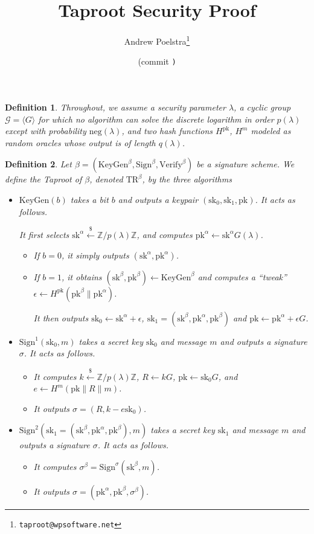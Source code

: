 \documentclass[letterpaper]{article}
\title{Taproot Security Proof}
\author{Andrew Poelstra\footnote{\texttt{taproot@wpsoftware.net}}}
\date{\gitAuthorDate{} (commit \texttt{\gitAbbrevHash)}}
\newtheorem{defn}{Definition}
\newcommand{\TR}[1]{\mathrm{TR}^{#1}}
\newcommand{\KeyGen}{\mathrm{KeyGen}}
\newcommand{\Sign}{\mathrm{Sign}}
\newcommand{\Verify}{\mathrm{Verify}}
\newcommand{\sk}{\mathrm{sk}}
\newcommand{\pk}{\mathrm{pk}}
\newcommand{\negl}{\mathrm{neg}}
\newcommand{\randgets}{\xleftarrow{\$}}
\begin{document}
\maketitle

\modulolinenumbers[10]

\begin{defn} Throughout, we assume a security parameter $\lambda$, a
cyclic group $\mathcal{G} = \langle G\rangle$ for which no algorithm can solve the
discrete logarithm in order $p(\lambda)$ except with probability
$\negl(\lambda)$, and two hash functions $H^\pk$, $H^m$ modeled as
random oracles whose output is of length $q(\lambda)$.\end{defn}

\begin{defn} Let $\beta = (\KeyGen^\beta, \Sign^\beta, \Verify^\beta)$ be a
signature scheme. We define the \emph{Taproot} of
$\beta$, denoted $\TR{\beta}$, by the three algorithms

\begin{itemize}
\item $\KeyGen(b)$ takes a bit $b$ and outputs a keypair
$(\sk_0, \sk_1, \pk)$. It acts as follows.

It first selects $\sk^\alpha\randgets\mathbb{Z}/p(\lambda)\mathbb{Z}$,
and computes $\pk^\alpha\gets\sk^\alpha G(\lambda)$.

\begin{itemize}
\item If $b=0$, it simply outputs $(\sk^\alpha, \pk^\alpha)$.
\item If $b=1$, it obtains $(\sk^\beta, \pk^\beta) \gets \KeyGen^\beta$ and computes
a ``tweak'' $\epsilon\gets H^\pk(\pk^\beta\|\pk^\alpha)$.

It then outputs $\sk_0\gets\sk^\alpha+\epsilon$, $\sk_1=(\sk^\beta, \pk^\alpha, \pk^\beta)$ and
$\pk\gets\pk^\alpha+\epsilon G$.
\end{itemize}

\item $\Sign^1(\sk_0, m)$ takes a secret key $\sk_0$ and message $m$ and outputs
a signature $\sigma$. It acts as follows.
\begin{itemize}
\item It computes $k\randgets\mathbb{Z}/p(\lambda)\mathbb{Z}$, $R\gets kG$, $\pk\gets
\sk_0G$, and $e\gets H^m(\pk\|R\|m)$.
\item It outputs $\sigma = (R, k - e\sk_0)$.
\end{itemize}

\item $\Sign^2(\sk_1 = (\sk^\beta, \pk^\alpha, \pk^\beta), m)$ takes a secret key $\sk_1$ and
message $m$ and outputs a signature $\sigma$. It acts as follows.
\begin{itemize}
\item It computes $\sigma^\beta = \Sign^\sigma(\sk^\beta, m)$.
\item It outputs $\sigma = (\pk^\alpha, \pk^\beta, \sigma^\beta)$.
\end{itemize}



\end{itemize}
\end{defn}
\end{document}
